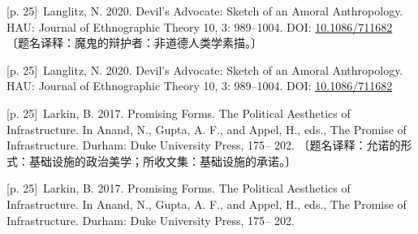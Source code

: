 \documentclass[10pt,a4paper]{article}
\begin{document}
\noindent\begin{minipage}{\textwidth}\begin{minipage}[t]{\dimexpr.5\textwidth-4mm\relax}\noindent\begin{minipage}[t]{\linewidth}{\scriptsize\color{gray} [p. 25]}\ Langlitz, N. 2020. Devil’s Advocate: Sketch of an Amoral Anthropology. HAU: Journal of Ethnographic Theory 10, 3: 989–1004. DOI: \url{10.1086/711682} 〔题名译释：魔鬼的辩护者：非道德人类学素描。〕\par\end{minipage}\par\end{minipage}\hfill\begin{minipage}[t]{\dimexpr.5\textwidth-4mm\relax}\noindent\begin{minipage}[t]{\linewidth}{\scriptsize\color{gray} [p. 25]}\ Langlitz, N. 2020. Devil’s Advocate: Sketch of an Amoral Anthropology. HAU: Journal of Ethnographic Theory 10, 3: 989–1004. DOI: \url{10.1086/711682}\par\end{minipage}\par\end{minipage}\end{minipage}\par
\noindent\begin{minipage}{\textwidth}\begin{minipage}[t]{\dimexpr.5\textwidth-4mm\relax}\noindent\begin{minipage}[t]{\linewidth}{\scriptsize\color{gray} [p. 25]}\ Larkin, B. 2017. Promising Forms. The Political Aesthetics of Infrastructure. In Anand, N., Gupta, A. F., and Appel, H., eds., The Promise of Infrastructure. Durham: Duke University Press, 175\textit{–} 202. 〔题名译释：允诺的形式：基础设施的政治美学；所收文集：基础设施的承诺。〕\par\end{minipage}\par\end{minipage}\hfill\begin{minipage}[t]{\dimexpr.5\textwidth-4mm\relax}\noindent\begin{minipage}[t]{\linewidth}{\scriptsize\color{gray} [p. 25]}\ Larkin, B. 2017. Promising Forms. The Political Aesthetics of Infrastructure. In Anand, N., Gupta, A. F., and Appel, H., eds., The Promise of Infrastructure. Durham: Duke University Press, 175\textit{–} 202.\par\end{minipage}\par\end{minipage}\end{minipage}\par
\end{document}
